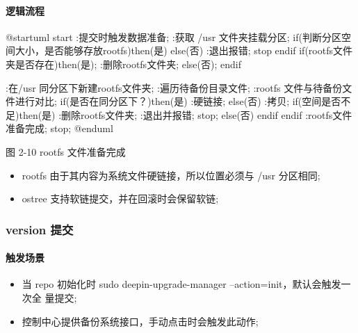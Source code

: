 \documentclass{utart}
\begin{document}
\paragraph{逻辑流程}
\begin{center}
  \begin{adjustbox}{scale=0.65}
    \begin{plantuml}
      @startuml
      start
      :提交时触发数据准备;
      :获取 /usr 文件夹挂载分区;
      if(判断分区空间大小，是否能够存放rootfs)then(是)
      else(否)
      :退出报错;
      stop
      endif
      if(rootfs文件夹是否存在)then(是);
      :删除rootfs文件夹;
      else(否);
      endif

      :在/usr 同分区下新建rootfs文件夹;
      :遍历待备份目录文件;
      :rootfs 文件与待备份文件进行对比;
      if(是否在同分区下？)then(是)
      :硬链接;
      else(否)
      :拷贝;
      if(空间是否不足)then(是)
      :删除rootfs文件夹;
      :退出并报错;
      stop;
      else(否)
      endif
      endif
      :rootfs文件准备完成;
      stop;
      @enduml
    \end{plantuml}
  \end{adjustbox}

  图 2-10 rootfs 文件准备完成
\end{center}

\begin{itemize}[leftmargin=4em]
  \item rootfs 由于其内容为系统文件硬链接，所以位置必须与 /usr 分区相同;
  \item ostree 支持软链提交，并在回滚时会保留软链;
\end{itemize}

\subsubsection{version 提交}
\paragraph{触发场景}
\begin{itemize}[leftmargin=4em]
  \item 当 repo 初始化时 sudo deepin-upgrade-manager --action=init，默认会触发一次全
  量提交;
  \item 控制中心提供备份系统接口，手动点击时会触发此动作;
\end{itemize}
\end{document}
